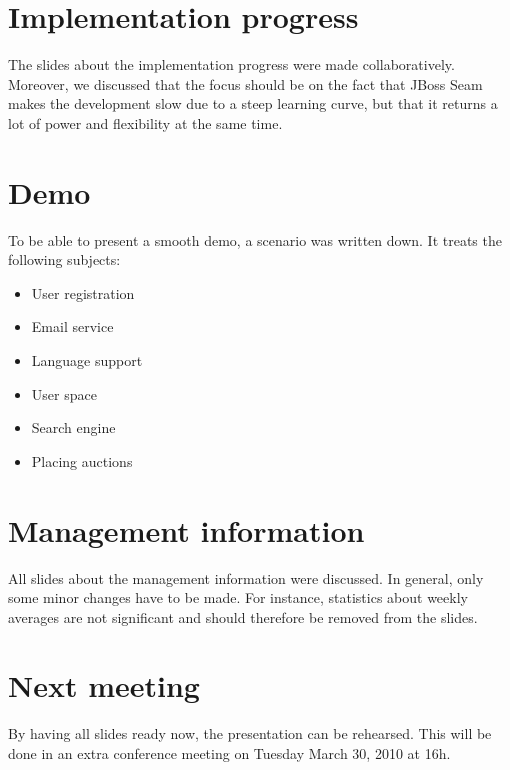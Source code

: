 \documentclass[a4paper, 12pt]{article}
\begin{document}
\section{Implementation progress}

The slides about the implementation progress were made collaboratively. Moreover, we discussed that the focus should be on the fact that JBoss Seam makes the development slow due to a steep learning curve, but that it returns a lot of power and flexibility at the same time. 

\section{Demo}

To be able to present a smooth demo, a scenario was written down. It treats the following subjects:
\begin{itemize}
	\item User registration
	\item Email service
	\item Language support
	\item User space
	\item Search engine
	\item Placing auctions
\end{itemize}


\section{Management information}

All slides about the management information were discussed. In general, only some minor changes have to be made. For instance, statistics about weekly averages are not significant and should therefore be removed from the slides.  



\section{Next meeting}

By having all slides ready now, the presentation can be rehearsed. This will be done in an extra conference meeting on Tuesday March 30, 2010 at 16h.

		
\end{document}
